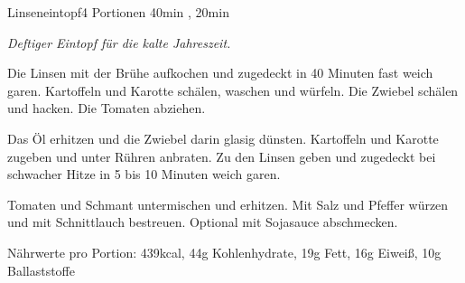 \documentclass[../recipe-collections/cooking.tex]{subfiles}
\begin{document}
\begin{recipe}{Linseneintopf}{4 Portionen }{40min , 20min }

  \freeform{}\textit{Deftiger Eintopf für die kalte Jahreszeit.}


  Die Linsen mit der Brühe aufkochen und zugedeckt in 40 Minuten fast weich garen.
  Kartoffeln und Karotte schälen, waschen und würfeln.
  Die Zwiebel schälen und hacken.
  Die Tomaten abziehen.


  Das Öl erhitzen und die Zwiebel darin glasig dünsten.
  Kartoffeln und Karotte zugeben und unter Rühren anbraten.
  Zu den Linsen geben und zugedeckt bei schwacher Hitze in 5 bis 10 Minuten weich garen.


  Tomaten und Schmant untermischen und erhitzen.
  Mit Salz und Pfeffer würzen und mit Schnittlauch bestreuen.
  Optional mit Sojasauce abschmecken.

  \freeform{}\hrulefill{}

  \freeform{}
  Nährwerte pro Portion: 439kcal, 44g Kohlenhydrate, 19g Fett, 16g Eiweiß, 10g Ballaststoffe

\end{recipe}
\end{document}
